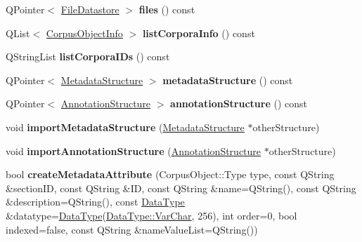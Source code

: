 \begin{DoxyCompactItemize}
\item 
\mbox{\label{class_corpus_repository_af6cb68593edf8602a6f7beaa7809cad8}} 
Q\+Pointer$<$ \hyperlink{class_file_datastore}{File\+Datastore} $>$ {\bfseries files} () const
\item 
\mbox{\label{class_corpus_repository_a29b9720969815b8becd5f0febede876c}} 
Q\+List$<$ \hyperlink{class_corpus_object_info}{Corpus\+Object\+Info} $>$ {\bfseries list\+Corpora\+Info} () const
\item 
\mbox{\label{class_corpus_repository_abf2613f6bba1e93209523db15a258d9f}} 
Q\+String\+List {\bfseries list\+Corpora\+I\+Ds} () const
\item 
\mbox{\label{class_corpus_repository_a009752d30d8ab46a45b6936a7942aeb6}} 
Q\+Pointer$<$ \hyperlink{class_metadata_structure}{Metadata\+Structure} $>$ {\bfseries metadata\+Structure} () const
\item 
\mbox{\label{class_corpus_repository_a4036acd92e1c4c231fc6d14af0ab6efc}} 
Q\+Pointer$<$ \hyperlink{class_annotation_structure}{Annotation\+Structure} $>$ {\bfseries annotation\+Structure} () const
\item 
\mbox{\label{class_corpus_repository_a5b72d1398004a43d71609a8f7e03a9c2}} 
void {\bfseries import\+Metadata\+Structure} (\hyperlink{class_metadata_structure}{Metadata\+Structure} $\ast$other\+Structure)
\item 
\mbox{\label{class_corpus_repository_ac087172e31a069907539d762fec9d830}} 
void {\bfseries import\+Annotation\+Structure} (\hyperlink{class_annotation_structure}{Annotation\+Structure} $\ast$other\+Structure)
\item 
\mbox{\label{class_corpus_repository_a135593a4adab48ef03bc4106116020a2}} 
bool {\bfseries create\+Metadata\+Attribute} (Corpus\+Object\+::\+Type type, const Q\+String \&section\+ID, const Q\+String \&ID, const Q\+String \&name=Q\+String(), const Q\+String \&description=Q\+String(), const \hyperlink{class_data_type}{Data\+Type} \&datatype=\hyperlink{class_data_type}{Data\+Type}(\hyperlink{class_data_type_a8df455d8d3949b604fbb2967dfeff239a160c768176611f2649889e252c756539}{Data\+Type\+::\+Var\+Char}, 256), int order=0, bool indexed=false, const Q\+String \&name\+Value\+List=Q\+String())

\end{DoxyCompactItemize}
